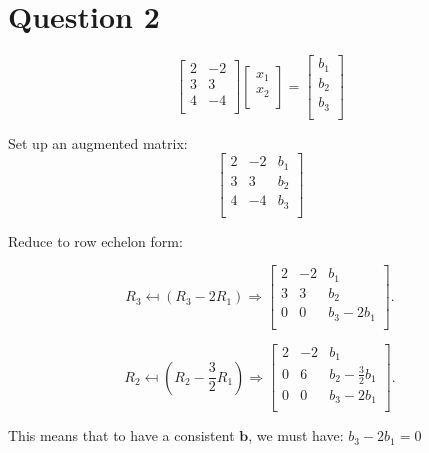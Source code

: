 \documentclass{article}
\begin{document}


\clearpage
\section{Question 2}
$$
\begin{bmatrix}
    2 & -2 \\
    3 & 3\\
    4 & -4\\
\end{bmatrix}
\begin{bmatrix}
    x_1 \\
    x_2\\
\end{bmatrix}
=
\begin{bmatrix}
    b_1 \\
    b_2 \\
    b_3 \\
\end{bmatrix}
$$

Set up an augmented matrix:
\[
    \begin{bmatrix}
        2 & -2 & b_1 \\
        3 &  3 & b_2 \\
        4 & -4 & b_3 \\
    \end{bmatrix}
\]

Reduce to row echelon form:

\[
    R_3 \mapsfrom (R_3 - 2 R_1)
    \Rightarrow
    \begin{bmatrix}
        2 & -2 & b_1       \\
        3 &  3 & b_2       \\
        0 &  0 & b_3-2 b_1 \\
    \end{bmatrix}
.\]


\[
    R_2 \mapsfrom (R_2 - \frac{3}{2} R_1)
    \Rightarrow
    \begin{bmatrix}
        2 & -2 & b_1                    \\
        0 &  6 & b_2 - \frac{3}{2} b_1  \\
        0 &  0 & b_3-2 b_1              \\
    \end{bmatrix}
.\]

This means that to have a consistent $\mathbf{b}$, we must have: $b_3 - 2 b_1 = 0$
\end{document}
